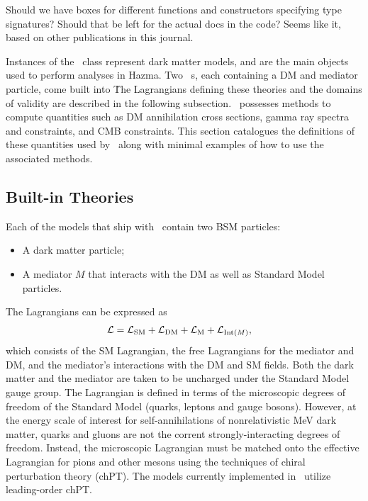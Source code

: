 {\color{red} Should we have boxes for different functions and constructors specifying type signatures? Should that be left for the actual docs in the code? Seems like it, based on other publications in this journal.}

Instances of the \theory\ class represent dark matter models, and are the main objects used to perform analyses in Hazma. Two \theory\ s, each containing a DM and mediator particle, come built into \hazma\. The Lagrangians defining these theories and the domains of validity are described in the following subsection. \theory\ possesses methods to compute quantities such as DM annihilation cross sections, gamma ray spectra and constraints, and CMB constraints. This section catalogues the definitions of these quantities used by \hazma\ along with minimal examples of how to use the associated methods.

\subsection{Built-in Theories}%
\label{sub:built_in_theories}


Each of the models that ship with \hazma\ contain two BSM particles:
\begin{itemize}
    \item A dark matter particle;
    \item A mediator $M$ that interacts with the DM as well as Standard Model particles.
\end{itemize}
The Lagrangians can be expressed as
\begin{align}
    \mathcal{L} &= \mathcal{L}_{\mathrm{SM}} + \mathcal{L}_{\mathrm{DM}} + \mathcal{L}_{\mathrm{M}} + \mathcal{L}_{{\mathrm{Int}}(M)},
\end{align}
which consists of the SM Lagrangian, the free Lagrangians for the mediator and DM, and the mediator's interactions with the DM and SM fields. Both the dark matter and the mediator are taken to be uncharged under the Standard Model gauge group. The Lagrangian is defined in terms of the microscopic degrees of freedom of the Standard Model (quarks, leptons and gauge bosons). However, at the energy scale of interest for self-annihilations of nonrelativistic MeV dark matter, quarks and gluons are not the corrent strongly-interacting degrees of freedom. Instead, the microscopic Lagrangian must be matched onto the effective Lagrangian for pions and other mesons using the techniques of chiral perturbation theory (chPT). The models currently implemented in \hazma\ utilize leading-order chPT. 

